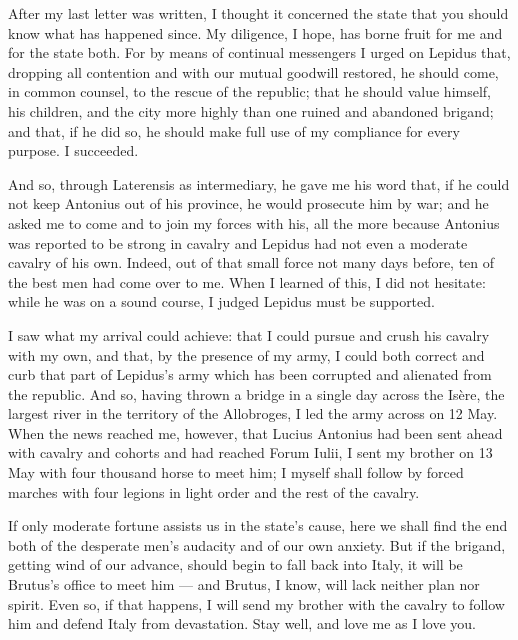 

 After my last letter was written, I thought it concerned the state that you should know what has happened since. My diligence, I hope, has borne fruit for me and for the state both. For by means of continual messengers I urged on Lepidus that, dropping all contention and with our mutual goodwill restored, he should come, in common counsel, to the rescue of the republic; that he should value himself, his children, and the city more highly than one ruined and abandoned brigand; and that, if he did so, he should make full use of my compliance for every purpose. I succeeded.

 And so, through Laterensis as intermediary, he gave me his word that, if he could not keep Antonius out of his province, he would prosecute him by war; and he asked me to come and to join my forces with his, all the more because Antonius was reported to be strong in cavalry and Lepidus had not even a moderate cavalry of his own. Indeed, out of that small force not many days before, ten of the best men had come over to me. When I learned of this, I did not hesitate: while he was on a sound course, I judged Lepidus must be supported.

 I saw what my arrival could achieve: that I could pursue and crush his cavalry with my own, and that, by the presence of my army, I could both correct and curb that part of Lepidus's army which has been corrupted and alienated from the republic. And so, having thrown a bridge in a single day across the Isère, the largest river in the territory of the Allobroges, I led the army across on 12 May. When the news reached me, however, that Lucius Antonius had been sent ahead with cavalry and cohorts and had reached Forum Iulii, I sent my brother on 13 May with four thousand horse to meet him; I myself shall follow by forced marches with four legions in light order and the rest of the cavalry.

 If only moderate fortune assists us in the state's cause, here we shall find the end both of the desperate men's audacity and of our own anxiety. But if the brigand, getting wind of our advance, should begin to fall back into Italy, it will be Brutus's office to meet him --- and Brutus, I know, will lack neither plan nor spirit. Even so, if that happens, I will send my brother with the cavalry to follow him and defend Italy from devastation. Stay well, and love me as I love you.
